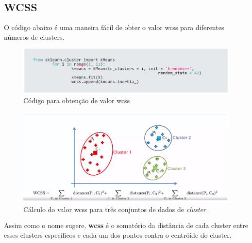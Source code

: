 \documentclass[12pt, a4paper, oneside]{scrreport}
\begin{document}
\subsection{WCSS}
O código abaixo é uma maneira fácil de obter o valor wcss para diferentes números de clusters.\par
\begin{figure}[h]
  \centering
  \includegraphics[scale=0.7]{1.png}
  \caption{Código para obtenção de valor wcss}   
  \label{fig:picture}
\end{figure}
\begin{figure}[b]
  \centering
  \includegraphics[scale=0.5]{2.png}
  \caption{Cálculo do valor wcss para três conjuntos de dados de \textit{cluster}}  
  \label{fig:picture}
\end{figure}
Assim como o nome sugere, \textbf{wcss} é o somatório da distância de cada cluster entre esses clusters específicos e cada um dos pontos contra o centróide do cluster.\par


\end{document}

